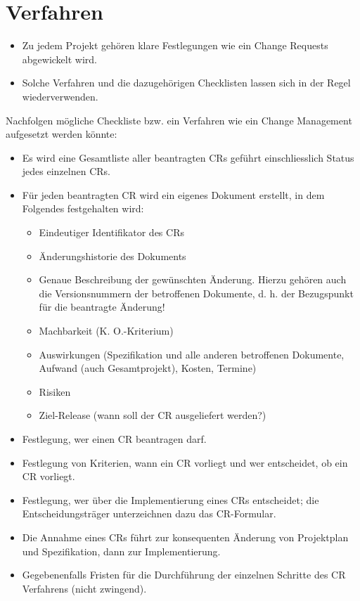 \section{Verfahren}
\label{sec:change_mgmt_verfahren}

\begin{itemize}
	\item Zu jedem Projekt gehören klare Festlegungen wie ein Change Requests abgewickelt wird.
	\item Solche Verfahren und die dazugehörigen Checklisten lassen sich in der Regel wiederverwenden.
\end{itemize}

Nachfolgen mögliche Checkliste bzw. ein Verfahren wie ein Change Management aufgesetzt werden könnte:
\begin{itemize}
	\item Es wird eine Gesamtliste aller beantragten CRs geführt einschliesslich Status jedes einzelnen CRs.
	\item Für jeden beantragten CR wird ein eigenes Dokument erstellt, in dem	Folgendes festgehalten wird:
	\begin{itemize}
		\item Eindeutiger Identifikator des CRs
		\item Änderungshistorie des Dokuments
		\item Genaue Beschreibung der gewünschten Änderung. Hierzu gehören
		auch die Versionsnummern der betroffenen Dokumente, d. h. der
		Bezugspunkt für die beantragte Änderung!
		\item Machbarkeit (K. O.-Kriterium)
		\item Auswirkungen (Spezifikation und alle anderen betroffenen Dokumente, Aufwand (auch Gesamtprojekt), Kosten, Termine)
		\item Risiken
		\item Ziel-Release (wann soll der CR ausgeliefert werden?)
	\end{itemize}
	\item Festlegung, wer einen CR beantragen darf.
	\item Festlegung von Kriterien, wann ein CR vorliegt und wer entscheidet, ob ein CR vorliegt.
	\item Festlegung, wer über die Implementierung eines CRs entscheidet; die	Entscheidungsträger unterzeichnen dazu das CR-Formular.
	\item Die Annahme eines CRs führt zur konsequenten Änderung von Projektplan und Spezifikation, dann zur Implementierung.
	\item Gegebenenfalls Fristen für die Durchführung der einzelnen Schritte des CR Verfahrens (nicht zwingend).
\end{itemize}

